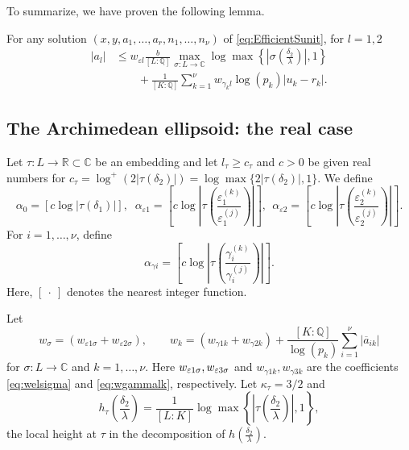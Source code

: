 To summarize, we have proven the following lemma.
\begin{lemma}\label{lem:mepsbound}
For any solution $(x,y,a_1, \dots, a_r, n_1, \dots, n_{\nu})$ of \eqref{eq:EfficientSunit}, for $l =1,2$
\begin{align*}
|a_l| & \leq  w_{\varepsilon l} \frac{b}{[L:\mathbb{Q}]} \max_{\sigma :L \to \mathbb{C}} \log \max \left\{ \left|\sigma\left(\frac{\delta_2}{\lambda}\right)\right|, 1\right\} \\
	& \quad \quad+ \frac{1}{[K:\mathbb{Q}]}\sum_{k = 1}^{\nu} w_{\gamma_k l}\log(p_k)|u_k - r_k|.
\end{align*}
\end{lemma}


\subsection{The Archimedean ellipsoid: the real case}
\label{subsec:ArchEllipsoid}

Let $\tau:L\to\mathbb{R} \subset \mathbb{C}$ be an embedding and let $l_\tau\geq c_\tau$ and $c>0$ be given real numbers for $c_\tau=\log^+(2|\tau(\delta_2)|)= \log \max\{2|\tau(\delta_2)|,1\}$. We define 
\begin{equation} \label{eq:alpha0eps}
\alpha_0 = [c\log|\tau(\delta_1)|], \;  \; \alpha_{\varepsilon 1} =  \left[c\log\left|\tau\left(\frac{\varepsilon_1^{(k)}}{\varepsilon_1^{(j)}}\right)\right|\right],\ \  \alpha_{\varepsilon 2} =  \left[c\log\left|\tau\left(\frac{\varepsilon_2^{(k)}}{\varepsilon_2^{(j)}}\right)\right|\right].
\end{equation}
For $i = 1, \dots, \nu$, define
\begin{equation} \label{eq:alphagamma}
\alpha_{\gamma i} = \left[c\log\left|\tau\left(\frac{\gamma_i^{(k)}}{\gamma_i^{(j)}}\right)\right|\right].
\end{equation}
Here, $[ \ \cdot\  ]$ denotes the nearest integer function. 

Let
\begin{equation} \label{eq:wsigma}
w_{\sigma} = (w_{\varepsilon 1 \sigma} + w_{\varepsilon 2 \sigma}), \quad \quad w_k = (w_{\gamma 1 k} + w_{\gamma 2 k}) + \frac{[K:\mathbb{Q}]}{\log(p_k)}\sum_{i=1}^{\nu}|\overline{a}_{ik}|
\end{equation}
for $\sigma: L \to \mathbb{C}$ and $k = 1, \dots, \nu$. Here $w_{\varepsilon 1 \sigma}, w_{\varepsilon 3 \sigma}$ and $w_{\gamma 1 k}, w_{\gamma 3 k}$ are the coefficients \eqref{eq:welsigma} and \eqref{eq:wgammalk}, respectively. Let $\kappa_{\tau} = 3/2$ and 
\[h_{\tau}\left(\frac{\delta_2}{\lambda}\right) = \frac{1}{[L:K]}\log \max \left\{ \left|\tau\left(\frac{\delta_2}{\lambda}\right)\right|, 1\right\},\]
the local height at $\tau$ in the decomposition of $h\left(\frac{\delta_2}{\lambda}\right)$.

